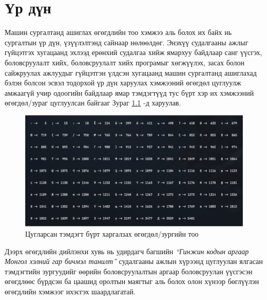 \chapter{Үр дүн}

Машин сургалтанд ашиглах өгөгдлийн тоо хэмжээ аль болох их байх нь сургалтын үр дүн, үзүүлэлтэнд сайнаар нөлөөлдөг. Энэхүү судалгааны ажлыг гүйцэтгэх хугацаанд эхлээд ерөнхий судалгаа хийж ямархуу байдлаар санг үүсгэх, боловсруулалт хийх, боловсруулалт хийх програмыг хөгжүүлэх, засах болон сайжруулах ажлуудыг гүйцэтгэн үлдсэн хугацаанд машин сургалтанд ашиглахад бэлэн болсон эсвэл тодорхой үр дүн харуулах хэмжээний өгөгдөл цуглуулж амжаагүй учир  одоогийн байдлаар ямар тэмдэгтүүд тус бүрт хэр их хэмжээний өгөгдөл/зураг цуглуулсан байгааг Зураг \ref{fig:result} -д харуулав.

\begin{figure}[ht]
	\centering
	\includegraphics[width=1\linewidth]{images/result.jpg}
	\caption{Цугларсан тэмдэгт бүрт харгалзах өгөгдөл/зургийн тоо}
	\label{fig:result}
\end{figure}

Дээрх өгөгдлийн дийлэнхи хувь нь удирдагч багшийн \textit{“Гинжин кодын аргаар Монгол хэлний гар бичмэл танилт”} \cite{mongolian-htr-using-chain-code} судалгааны ажлын хүрээнд цуглуулан ялгасан тэмдэгтийн зургуудийг өөрийн боловсруулалтын аргаар боловсруулан үүсгэсэн өгөгдлөөс бүрдсэн ба цаашид оролтын маягтыг аль болох олон хүнээр бөглүүлэн өгөгдлийн хэмжээг ихэсгэх шаардлагатай.